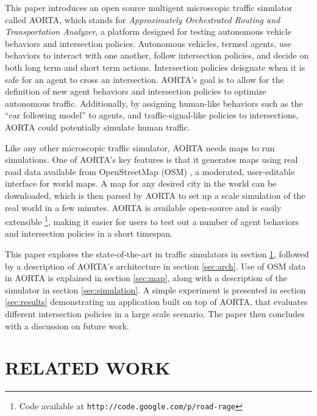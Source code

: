 \documentclass[letterpaper, 10 pt, conference]{ieeeconf}  %
\begin{document}

This paper introduces an open source multigent microscopic traffic simulator
called AORTA, which stands for \textit{Approximately Orchestrated Routing and
Transportation Analyzer}, a platform designed for testing autonomous vehicle
behaviors and intersection policies. Autonomous vehicles, termed agents, use
behaviors to interact with one another, follow intersection policies, and
decide on both long term and short term actions. Intersection policies
deisgnate when it is safe for an agent to cross an intersection.  AORTA's goal
is to allow for the definition of new agent behaviors and intersection policies
to optimize autonomous traffic. Additionally, by assigning human-like behaviors
such as the ``car following model'' \cite{brackstone1999car} to agents, and
traffic-signal-like policies to intersections, AORTA could potentially simulate
human traffic.


Like any other microscopic traffic simulator, AORTA needs maps to run
simulations. One of AORTA's key features is that it generates maps using real
road data available from OpenStreetMap (OSM) \cite{osm}, a moderated,
user-editable interface for world maps. A map for any desired city in the world
can be downloaded, which is then parsed by AORTA to set up a scale simulation
of the real world in a few minutes. AORTA is available open-source and is
easily extensible \footnote{Code available at
\texttt{http://code.google.com/p/road-rage}}, making it easier for users to
test out a number of agent behaviors and intersection policies in a short
timespan.

This paper explores the state-of-the-art in traffic simulators in section
\ref{sec:related_work}, followed by a description of AORTA's architecture in
section \ref{sec:arch}.  Use of OSM data in AORTA is explained in section
\ref{sec:map}, along with a description of the simulator in section
\ref{sec:simulation}. A simple experiment is presented in section
\ref{sec:results} demonstrating an application built on top of AORTA, that
evaluates different intersection policies in a large scale scenario. The paper
then concludes with a discussion on future work.


\section{RELATED WORK}
\label{sec:related_work}
\end{document}
